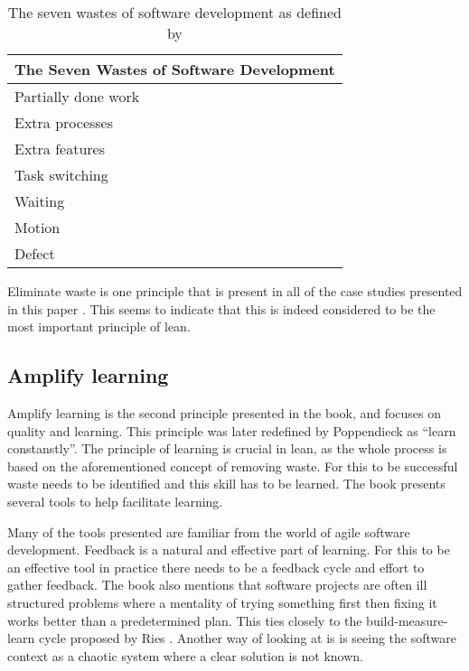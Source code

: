 \begin{table}
  \begin{tabular}{| l |}
    \hline
    The Seven Wastes of Software Development \\
    \hline
    Partially done work\\
    Extra processes\\
    Extra features\\
    Task switching\\
    Waiting\\
    Motion\\
    Defect\\
    \hline
  \end{tabular}
  \caption{The seven wastes of software development as defined by \cite{poppendieck2003lean}}
  \label{tbl:sevenwastes}
\end{table}

Eliminate waste is one principle that is present in all of the case studies presented in this paper \cite{Middleton2001Lean}\cite{Middleton2012Lean}\cite{Middleton2005Lean}\cite{Rodriguez2014Combining}. This seems to indicate that this is indeed considered to be the most important principle of lean.

\subsection{Amplify learning}

Amplify learning is the second principle presented in the book, and focuses on quality and learning\cite{poppendieck2003lean}. This principle was later redefined by Poppendieck as ``learn constanstly''\cite{Poppendieck2010Lean}. The principle of learning is crucial in lean, as the whole process is based on the aforementioned concept of removing waste. For this to be successful waste needs to be identified and this skill has to be learned. The book presents several tools to help facilitate learning. 

Many of the tools presented are familiar from the world of agile software development. Feedback is a natural and effective part of learning. For this to be an effective tool in practice there needs to be a feedback cycle and effort to gather feedback. The book also mentions that software projects are often ill structured problems where a mentality of trying something first then fixing it works better than a predetermined plan.\cite{poppendieck2003lean} This ties closely to the build-measure-learn cycle proposed by Ries \cite{ries2011lean}. Another way of looking at is is seeing the software context as a chaotic system where a clear solution is not known.

